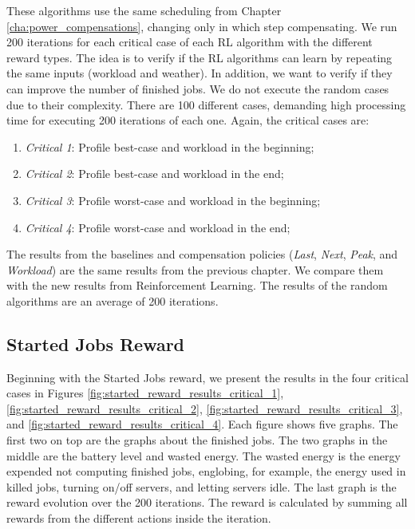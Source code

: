 These algorithms use the same scheduling from Chapter \ref{cha:power_compensations}, changing only in which step compensating. We run 200 iterations for each critical case of each RL algorithm with the different reward types. The idea is to verify if the RL algorithms can learn by repeating the same inputs (workload and weather). In addition, we want to verify if they can improve the number of finished jobs. We do not execute the random cases due to their complexity. There are 100 different cases, demanding high processing time for executing 200 iterations of each one. Again, the critical cases are:
\begin{enumerate}
    \item \emph{Critical 1}: Profile best-case and workload in the beginning;
    \item \emph{Critical 2}: Profile best-case and workload in the end;
    \item \emph{Critical 3}: Profile worst-case and workload in the beginning;
    \item \emph{Critical 4}: Profile worst-case and workload in the end;
\end{enumerate}

The results from the baselines and compensation policies (\emph{Last}, \emph{Next}, \emph{Peak}, and \emph{Workload}) are the same results from the previous chapter. We compare them with the new results from Reinforcement Learning. The results of the random algorithms are an average of 200 iterations.

\subsection{Started Jobs Reward}

Beginning with the Started Jobs reward, we present the results in the four critical cases in Figures \ref{fig:started_reward_results_critical_1}, \ref{fig:started_reward_results_critical_2}, \ref{fig:started_reward_results_critical_3}, and \ref{fig:started_reward_results_critical_4}. Each figure shows five graphs. The first two on top are the graphs about the finished jobs. The two graphs in the middle are the battery level and wasted energy. The wasted energy is the energy expended not computing finished jobs, englobing, for example, the energy used in killed jobs, turning on/off servers, and letting servers idle. The last graph is the reward evolution over the 200 iterations. The reward is calculated by summing all rewards from the different actions inside the iteration.

